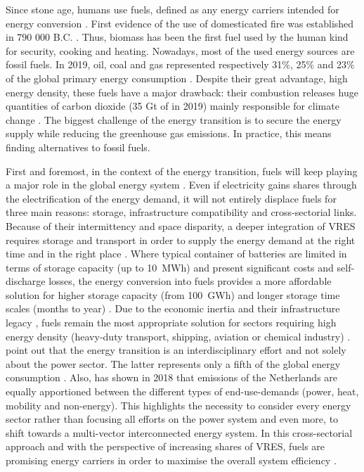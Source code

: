 Since stone age, humans use fuels, defined as any energy carriers intended for energy conversion \cite{FAO_biofuel, ISO16559}. First evidence of the use of domesticated fire was established in 790 000 B.C. \cite{alperson2010acheulian}. Thus, biomass has been the first fuel used by the human kind for security, cooking and heating. Nowadays, most of the used energy sources are fossil fuels. In 2019, oil, coal and gas represented respectively 31\%, 25\% and 23\% of the global primary energy consumption \cite{ourworld_2019}. Despite their great advantage, high energy density, these fuels have a major drawback: their combustion releases huge quantities of carbon dioxide (35 Gt of  in 2019) mainly responsible for climate change \cite{iea2020world}. The biggest challenge of the energy transition is to secure the energy supply while reducing the greenhouse gas emissions. In practice, this means finding alternatives to fossil fuels.

First and foremost, in the context of the energy transition, fuels will keep playing a major role in the global energy system \cite{Ahlgren2012}. Even if electricity gains shares through the electrification of the energy demand, it will not entirely displace fuels for three main reasons: storage, infrastructure compatibility and cross-sectorial links. Because of their intermittency and space disparity, a deeper integration of \gls{VRES} requires storage and transport in order to supply the energy demand at the right time and in the right place \cite{Brouwer2016,Evans2012,Gallo2016,hall2008,Rosa2017}. Where typical container of batteries are limited in terms of storage capacity (up to 10~MWh) and present significant costs and self-discharge losses, the energy conversion into fuels provides a more affordable solution for higher storage capacity (from 100~GWh) and longer storage time scales (months to year) \cite{Rosa2017}. Due to the economic inertia and their infrastructure legacy \cite{Ahlgren2012}, fuels remain the most appropriate solution for sectors requiring high energy density (\eg heavy-duty transport, shipping, aviation or chemical industry) \cite{Albrecht2020,Decker2019,Goede2018,Pearson2012,Rosa2017,Stancin2020,Trieb2018,Zeman2008}. 
\citet{contino2020whole} point out that the energy transition is an interdisciplinary effort and not solely about the power sector. The latter represents only a fifth of the global energy consumption \cite{iea_renewable}. Also, \citet{Goede2018} has shown in 2018 that  emissions of the Netherlands are equally apportioned between the different types of end-use-demands (\ie power, heat, mobility and non-energy). This highlights the necessity to consider every energy sector rather than focusing all efforts on the power system and even more, to shift towards a multi-vector interconnected energy system. In this cross-sectorial approach and with the perspective of increasing shares of \gls{VRES}, fuels are promising energy carriers in order to maximise the overall system efficiency \cite{mathiesen2015, Stancin2020}.

